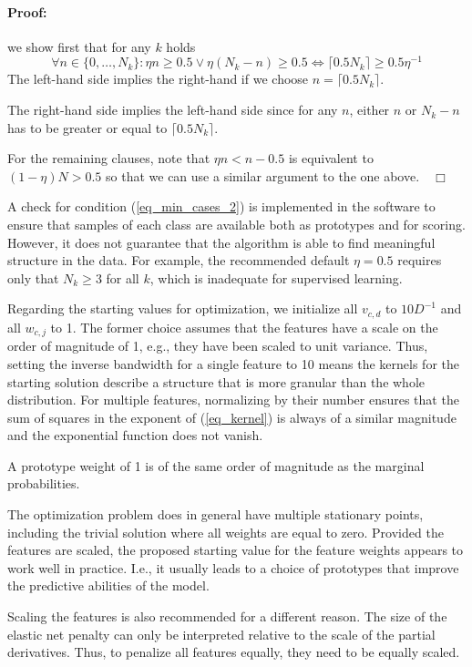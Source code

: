 \paragraph{Proof:} we show first that for any $k$ holds
%
\begin{equation}
\forall n\in\{0,\dots,N_k\}:\eta n\geq0.5\vee\eta(N_k-n)\geq0.5\iff\lceil0.5N_k\rceil\geq0.5\eta^{-1}\label{eq_condition_proof}
\end{equation}
%
The left-hand side implies the right-hand if we choose $n=\lceil0.5N_k\rceil$.\par
%
The right-hand side implies the left-hand side since for any $n$, either $n$ or $N_k-n$ has to be greater or equal to $\lceil0.5N_k\rceil$.\par
%
For the remaining clauses, note that $\eta n<n-0.5$ is equivalent to $(1-\eta)N>0.5$ so that we can use a similar argument to the one above.$\quad\Box$\par
%
A check for condition (\ref{eq_min_cases_2}) is implemented in the software to ensure that samples of each class are available both as prototypes and for scoring.
However, it does not guarantee that the algorithm is able to find meaningful structure in the data.
For example, the recommended default $\eta=0.5$ requires only that $N_k\geq3$ for all $k$, which is inadequate for supervised learning.\par
%
Regarding the starting values for optimization, we initialize all $v_{c,d}$ to $10D^{-1}$ and all $w_{c,j}$ to 1.
The former choice assumes that the features have a scale on the order of magnitude of 1, e.g., they have been scaled to unit variance.
Thus, setting the inverse bandwidth for a single feature to 10 means the kernels for the starting solution describe a structure that is more granular than the whole distribution.
For multiple features, normalizing by their number ensures that the sum of squares in the exponent of (\ref{eq_kernel}) is always of a similar magnitude and the exponential function does not vanish.\par
%
A prototype weight of 1 is of the same order of magnitude as the marginal probabilities.
%
\begin{remark}
The optimization problem does in general have multiple stationary points, including the trivial solution where all weights are equal to zero.
Provided the features are scaled, the proposed starting value for the feature weights appears to work well in practice.
I.e., it usually leads to a choice of prototypes that improve the predictive abilities of the model.\par
%
Scaling the features is also recommended for a different reason.
The size of the elastic net penalty can only be interpreted relative to the scale of the partial derivatives.
Thus, to penalize all features equally, they need to be equally scaled.
\end{remark}
